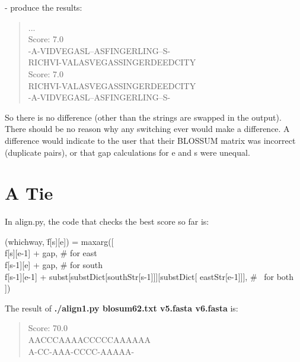\documentclass[12pt]{article}
\begin{document}
	- produce the results:
	\begin{verse}
		... \\
		Score: 7.0 \\
		-A-VIDVEGASL--ASFINGERLING--S- \\
		RICHVI-VALASVEGASSINGERDEEDCITY \\
		Score: 7.0 \\
		RICHVI-VALASVEGASSINGERDEEDCITY \\
		-A-VIDVEGASL--ASFINGERLING--S- 
	\end{verse}

	So there is no difference (other than the strings are swapped in the output). There should be no reason why any switching ever would make a difference. A difference would indicate to the user that their BLOSSUM matrix was incorrect (duplicate pairs), or that gap calculations for e and s were unequal.

	
	\section{A Tie}
	In align.py, the code that checks the best score so far is:
	\begin{tabbing}
		(whichway, \= f[s][e]) = maxarg([	\\
		\>	          f[s][e-1] + gap,               \# for east  \\                                  
		\>         	 f[s-1][e] + gap,               \# for south   \\                                
		\>              f[s-1][e-1] + subst[substDict[southStr[s-1]]][substDict[ eastStr[e-1]]],  \# \
for both  \\                                                                                                
		]) \\
	\end{tabbing}

	The result of \textbf{./align1.py blosum62.txt v5.fasta v6.fasta} is:
	\begin{verse}
		Score: 70.0 \\
		AACCCAAAACCCCCAAAAAA \\
		A-CC-AAA-CCCC-AAAAA-
	\end{verse}
	
\end{document}
